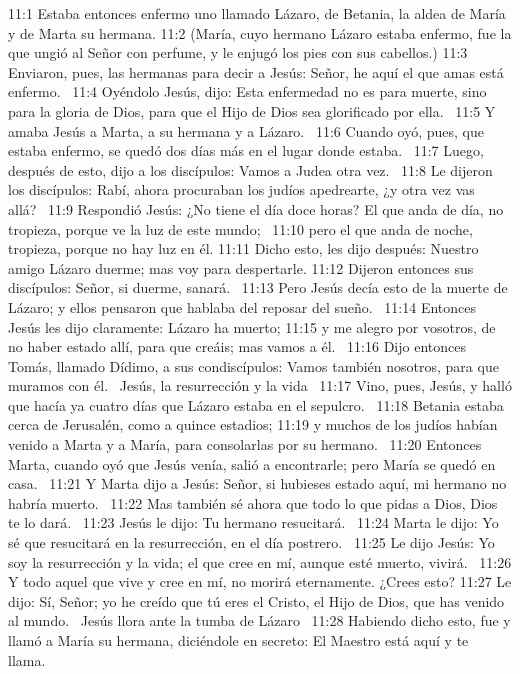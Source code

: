 11:1 Estaba entonces enfermo uno llamado Lázaro, de Betania, la aldea de María y de Marta su hermana. 
11:2 (María, cuyo hermano Lázaro estaba enfermo, fue la que ungió al Señor con perfume, y le enjugó los pies con sus cabellos.) 
11:3 Enviaron, pues, las hermanas para decir a Jesús: Señor, he aquí el que amas está enfermo.  
11:4 Oyéndolo Jesús, dijo: Esta enfermedad no es para muerte, sino para la gloria de Dios, para que el Hijo de Dios sea glorificado por ella.  
11:5 Y amaba Jesús a Marta, a su hermana y a Lázaro.  
11:6 Cuando oyó, pues, que estaba enfermo, se quedó dos días más en el lugar donde estaba.  
11:7 Luego, después de esto, dijo a los discípulos: Vamos a Judea otra vez.  
11:8 Le dijeron los discípulos: Rabí, ahora procuraban los judíos apedrearte, ¿y otra vez vas allá?  
11:9 Respondió Jesús: ¿No tiene el día doce horas? El que anda de día, no tropieza, porque ve la luz de este mundo;  
11:10 pero el que anda de noche, tropieza, porque no hay luz en él. 
11:11 Dicho esto, les dijo después: Nuestro amigo Lázaro duerme; mas voy para despertarle. 
11:12 Dijeron entonces sus discípulos: Señor, si duerme, sanará.  
11:13 Pero Jesús decía esto de la muerte de Lázaro; y ellos pensaron que hablaba del reposar del sueño.  
11:14 Entonces Jesús les dijo claramente: Lázaro ha muerto; 
11:15 y me alegro por vosotros, de no haber estado allí, para que creáis; mas vamos a él.  
11:16 Dijo entonces Tomás, llamado Dídimo, a sus condiscípulos: Vamos también nosotros, para que muramos con él.  
Jesús, la resurrección y la vida  
11:17 Vino, pues, Jesús, y halló que hacía ya cuatro días que Lázaro estaba en el sepulcro.  
11:18 Betania estaba cerca de Jerusalén, como a quince estadios; 
11:19 y muchos de los judíos habían venido a Marta y a María, para consolarlas por su hermano.  
11:20 Entonces Marta, cuando oyó que Jesús venía, salió a encontrarle; pero María se quedó en casa.  
11:21 Y Marta dijo a Jesús: Señor, si hubieses estado aquí, mi hermano no habría muerto.  
11:22 Mas también sé ahora que todo lo que pidas a Dios, Dios te lo dará.  
11:23 Jesús le dijo: Tu hermano resucitará.  
11:24 Marta le dijo: Yo sé que resucitará en la resurrección, en el día postrero.  
11:25 Le dijo Jesús: Yo soy la resurrección y la vida; el que cree en mí, aunque esté muerto, vivirá.  
11:26 Y todo aquel que vive y cree en mí, no morirá eternamente. ¿Crees esto? 
11:27 Le dijo: Sí, Señor; yo he creído que tú eres el Cristo, el Hijo de Dios, que has venido al mundo.  
Jesús llora ante la tumba de Lázaro  
11:28 Habiendo dicho esto, fue y llamó a María su hermana, diciéndole en secreto: El Maestro está aquí y te llama.  
